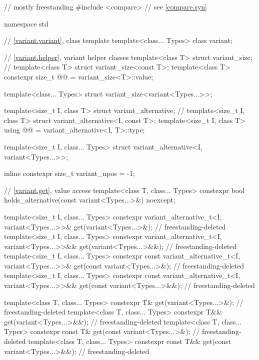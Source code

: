 \begin{codeblock}
// mostly freestanding
#include <compare>              // see \ref{compare.syn}

namespace std {
  // \ref{variant.variant}, class template 
  template<class... Types>
    class variant;

  // \ref{variant.helper}, variant helper classes
  template<class T> struct variant_size;                        // \notdef
  template<class T> struct variant_size<const T>;
  template<class T>
    constexpr size_t @@ = variant_size<T>::value;

  template<class... Types>
    struct variant_size<variant<Types...>>;

  template<size_t I, class T> struct variant_alternative;       // \notdef
  template<size_t I, class T> struct variant_alternative<I, const T>;
  template<size_t I, class T>
    using @@ = variant_alternative<I, T>::type;

  template<size_t I, class... Types>
    struct variant_alternative<I, variant<Types...>>;

  inline constexpr size_t variant_npos = -1;

  // \ref{variant.get}, value access
  template<class T, class... Types>
    constexpr bool holds_alternative(const variant<Types...>&) noexcept;

  template<size_t I, class... Types>
    constexpr variant_alternative_t<I, variant<Types...>>&
      get(variant<Types...>&);                                          // freestanding-deleted
  template<size_t I, class... Types>
    constexpr variant_alternative_t<I, variant<Types...>>&&
      get(variant<Types...>&&);                                         // freestanding-deleted
  template<size_t I, class... Types>
    constexpr const variant_alternative_t<I, variant<Types...>>&
      get(const variant<Types...>&);                                    // freestanding-deleted
  template<size_t I, class... Types>
    constexpr const variant_alternative_t<I, variant<Types...>>&&
      get(const variant<Types...>&&);                                   // freestanding-deleted

  template<class T, class... Types>
    constexpr T& get(variant<Types...>&);                               // freestanding-deleted
  template<class T, class... Types>
    constexpr T&& get(variant<Types...>&&);                             // freestanding-deleted
  template<class T, class... Types>
    constexpr const T& get(const variant<Types...>&);                   // freestanding-deleted
  template<class T, class... Types>
    constexpr const T&& get(const variant<Types...>&&);                 // freestanding-deleted

}
\end{codeblock}
